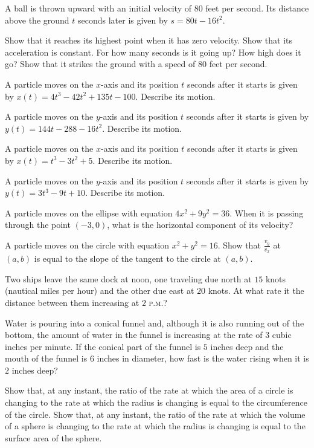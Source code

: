 \begin{exercises}

A ball is thrown upward with an initial velocity of $80$ feet per second.
Its distance above the ground $t$ seconds later is given by
$s = 80t - 16t^2$.
\begin{exenum}
\sx
Show that it reaches its highest point when it has zero velocity.
\sx
Show that its acceleration is constant.
\sx
For how many seconds is it going up?
\sx
How high does it go?
\sx
Show that it strikes the ground with a speed of $80$
feet per second.
\end{exenum}

A particle moves on the $x$-axis and its position $t$ seconds
after it starts is given by
$x(t) = 4t^3 - 42t^2 + 135t - 100$.
Describe its motion.

A particle moves on the $y$-axis and its position $t$ seconds
after it starts is given by $y(t) = 144t - 288 - 16t^2$.
Describe its motion.

A particle moves on the $x$-axis and its position $t$ seconds after
it starts is given by
$x(t) = t^3 - 3t^2 + 5$.
Describe its motion.

A particle moves on the $y$-axis and its position $t$ seconds after
it starts is given by $y(t) = 3t^3 - 9t + 10$.
Describe its motion.

A particle moves on the ellipse with equation
$4x^2 + 9y^2 = 36$.  When it is passing through the point
$(-3,0)$, what is the horizontal component of its velocity?

A particle moves on the circle with equation $x^2 + y^2 = 16$.
Show that $\frac{v_y}{v_x}$ at $(a,b)$ is equal to the slope
of the tangent to the circle at $(a,b)$.

Two ships leave the same dock at noon, one traveling due north
at $15$ knots (nautical miles per hour) and the other due east
at $20$ knots.  At what rate it the distance between them increasing
at $2$ \textsc{p.m.}?

Water is pouring into a conical funnel and, although it is also
running out of the bottom, the amount of water in the funnel
is increasing at the rate of $3$ cubic inches per minute.
If the conical part of the funnel is $5$ inches deep and the mouth
of the funnel is $6$ inches in diameter, how fast is the water
rising when it is $2$ inches deep?

\begin{exenum}
\sx
Show that, at any instant, the ratio of the rate at which the area
of a circle is changing to the rate at which the radius is changing
is equal to the circumference of the circle.
\sx
Show that, at any instant, the ratio of the rate at which the volume
of a sphere is changing to the rate at which the radius is changing
is equal to the surface area of the sphere.
\end{exenum}


\end{exercises}
